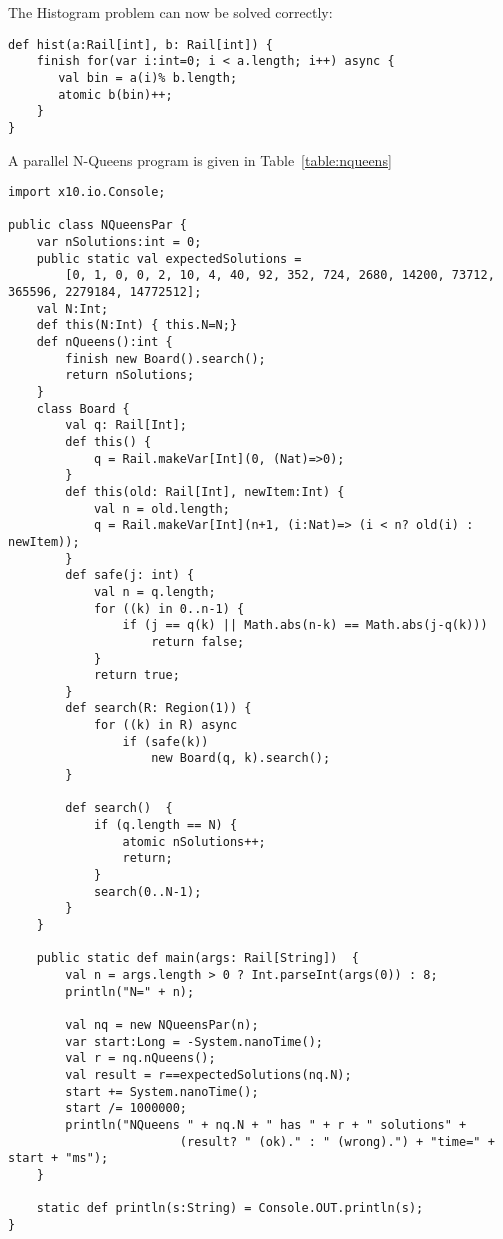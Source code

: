 The Histogram problem can now be solved correctly:
{\footnotesize
\begin{verbatim}
def hist(a:Rail[int], b: Rail[int]) {
    finish for(var i:int=0; i < a.length; i++) async {
       val bin = a(i)% b.length;
       atomic b(bin)++;
    }
}
\end{verbatim}}

A parallel N-Queens program is given in Table~\ref{table:nqueens}
\begin{table}
{\footnotesize
\begin{verbatim}
import x10.io.Console;

public class NQueensPar {
    var nSolutions:int = 0;
    public static val expectedSolutions =
        [0, 1, 0, 0, 2, 10, 4, 40, 92, 352, 724, 2680, 14200, 73712, 365596, 2279184, 14772512];
    val N:Int;
    def this(N:Int) { this.N=N;}
    def nQueens():int {
        finish new Board().search();
        return nSolutions;
    }
    class Board {
        val q: Rail[Int];
        def this() {
            q = Rail.makeVar[Int](0, (Nat)=>0);
        }
        def this(old: Rail[Int], newItem:Int) {
            val n = old.length;
            q = Rail.makeVar[Int](n+1, (i:Nat)=> (i < n? old(i) : newItem));
        }
        def safe(j: int) {
            val n = q.length;
            for ((k) in 0..n-1) {
                if (j == q(k) || Math.abs(n-k) == Math.abs(j-q(k)))
                    return false;
            }
            return true;
        }
        def search(R: Region(1)) {
            for ((k) in R) async
                if (safe(k))
                    new Board(q, k).search();
        }

        def search()  {
            if (q.length == N) {
                atomic nSolutions++;
                return;
            }
            search(0..N-1);
        }
    }

    public static def main(args: Rail[String])  {
        val n = args.length > 0 ? Int.parseInt(args(0)) : 8;
        println("N=" + n);
        
        val nq = new NQueensPar(n);
        var start:Long = -System.nanoTime();
        val r = nq.nQueens();
        val result = r==expectedSolutions(nq.N);
        start += System.nanoTime();
        start /= 1000000;
        println("NQueens " + nq.N + " has " + r + " solutions" +
                        (result? " (ok)." : " (wrong).") + "time=" + start + "ms");
    }

    static def println(s:String) = Console.OUT.println(s);
}
\end{verbatim}}
\caption{NQueens}\label{table:nqueens}
\end{table}

